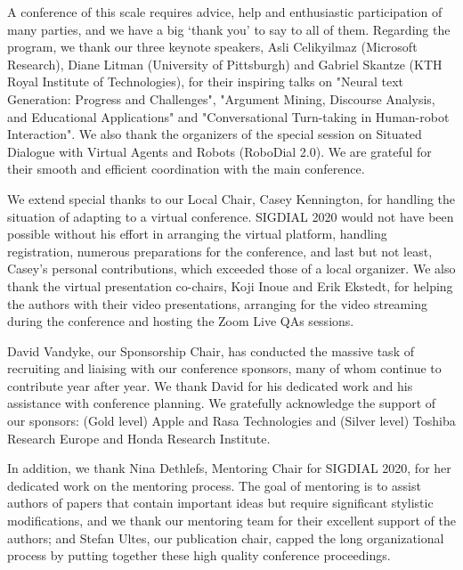 A conference of this scale requires advice, help and enthusiastic participation of many parties, and we have a big `thank you' to say to all of them. Regarding the program, we thank our three keynote speakers, Asli Celikyilmaz (Microsoft Research), Diane Litman (University of Pittsburgh) and Gabriel Skantze (KTH Royal Institute of Technologies),   for their inspiring talks on "Neural text Generation: Progress and Challenges", "Argument Mining, Discourse Analysis, and Educational Applications" and "Conversational Turn-taking in Human-robot Interaction". 
We also thank the organizers of the special session on Situated Dialogue with Virtual Agents and Robots (RoboDial 2.0). We are grateful for their smooth and efficient coordination with the main conference.

We extend special thanks to our Local Chair, Casey Kennington, for handling the  situation of adapting to a virtual conference. SIGDIAL 2020 would not have been possible without his effort in arranging the virtual platform, handling registration, numerous preparations for the conference, and last but not least, Casey's personal contributions, which exceeded those of a local organizer. We also thank the virtual presentation co-chairs, Koji Inoue and Erik Ekstedt, for helping the authors with their video presentations, arranging for the video streaming during the conference and hosting the Zoom Live QAs sessions. 

David Vandyke, our Sponsorship Chair, has conducted the massive task of recruiting and liaising with our conference sponsors, many of whom continue to contribute year after year. We thank David for his dedicated work and his assistance with conference planning. We gratefully acknowledge the support of our sponsors: (Gold level) Apple and Rasa Technologies and (Silver level) Toshiba Research Europe and Honda Research Institute. %

In addition, we thank Nina Dethlefs, Mentoring Chair for SIGDIAL 2020, for her dedicated work on the mentoring process. The goal of mentoring is to assist authors of papers that contain important ideas but require significant stylistic modifications, and we thank our mentoring team for their excellent support of the authors; and Stefan Ultes, our publication chair, capped the long organizational process by putting together these high quality conference proceedings.


